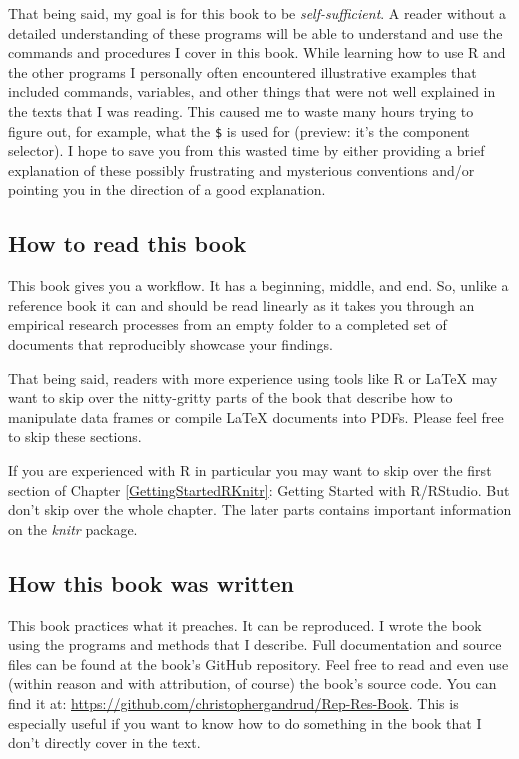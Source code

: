 That being said, my goal is for this book to be {\emph{self-sufficient}}. A reader without a detailed understanding of these programs will be able to understand and use the commands and procedures I cover in this book. While learning how to use R and the other programs I personally often encountered illustrative examples that included commands, variables, and other things that were not well explained in the texts that I was reading. This caused me to waste many hours trying to figure out, for example, what the \texttt{\$} is used for (preview: it's the component selector). I hope to save you from this wasted time by either providing a brief explanation of these possibly frustrating and mysterious conventions and/or pointing you in the direction of a good explanation.

\subsection{How to read this book}

This book gives you a workflow. It has a beginning, middle, and end. So, unlike a reference book it can and should be read linearly as it takes you through an empirical research processes from an empty folder to a completed set of documents that reproducibly showcase your findings.

That being said, readers with more experience using tools like R or LaTeX may want to skip over the nitty-gritty parts of the book that describe how to manipulate data frames or compile LaTeX documents into PDFs. Please feel free to skip these sections.

If you are experienced with R in particular you may want to skip over the first section of Chapter \ref{GettingStartedRKnitr}: Getting Started with R/RStudio. But don't skip over the whole chapter. The later parts contains important information on the {\emph{knitr}} package. 

\subsection{How this book was written}

This book practices what it preaches. It can be reproduced. I wrote the book using the programs and methods that I describe. Full documentation and source files can be found at the book's GitHub repository. Feel free to read and even use (within reason and with attribution, of course) the book's source code. You can find it at: \url{https://github.com/christophergandrud/Rep-Res-Book}. This is especially useful if you want to know how to do something in the book that I don't directly cover in the text.

